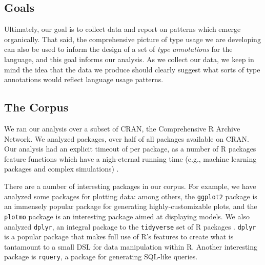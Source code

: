 \documentclass[acmsmall,10pt,review,anonymous]{acmart}\settopmatter{printfolios=true,printccs=false,printacmref=false}
\begin{document}
%
%
%
%
\subsection{Goals}

Ultimately, our goal is to collect data and report on patterns which emerge
organically.  That said, the comprehensive picture of type usage we are
developing can also be used to inform the design of a set of \textit{type
  annotations} for the language, and this goal informs our analysis.  As we
collect our data, we keep in mind the idea that the data we produce should
clearly suggest what sorts of type annotations would reflect language usage
patterns.

%
%
%
%
\subsection{The Corpus}


We ran our analysis over a subset of CRAN, the Comprehensive R Archive
Network.  We analyzed  packages, over half of all packages
available on CRAN.  Our analysis had an explicit timeout of 
per package, as a number of R packages feature functions which have a
nigh-eternal running time (e.g., machine learning packages and complex
simulations) .

There are a number of interesting packages in our corpus.    For example, we have analyzed some packages for
plotting data: among others, the {\tt ggplot2} package is an immensely
popular package for generating highly-customizable plots, and the {\tt
  plotmo} package is an interesting package aimed at displaying models.  We
also analyzed {\tt dplyr}, an integral package to the {\tt tidyverse} set of
R packages .  {\tt dplyr} is a
popular package that makes full use of R's features to create what is
tantamount to a small DSL for data manipulation within R.  Another
interesting package is {\tt rquery}, a package for generating SQL-like
queries.

\end{document}
